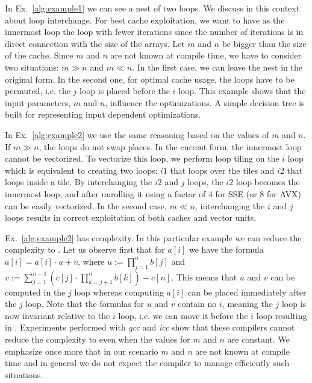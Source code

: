 \setcounter{algorithm}{1}

In Ex.~\ref{alg:example1} we can see a nest of two loops. We discuss in this
context about loop interchange. For best cache exploitation, we want to have as
the innermost loop the loop with fewer iterations since the number of iterations
is in direct connection with the size of the arrays. Let $m$ and $n$ be bigger
than the size of the cache. Since $m$ and $n$ are not known at compile time, we
have to consider two situations: $m \gg n$ and $m \ll n$. In the first case, we
can leave the nest in the original form. In the second one, for optimal cache
usage, the loops have to be permuted, i.e. the $j$ loop is placed before the $i$
loop. This example shows that the input parameters, $m$ and $n$, influence the
optimizations. A simple decision tree is built for representing input dependent
optimizations.

In Ex.~\ref{alg:example2} we use the same reasoning based on the values of $m$
and $n$. If $m \gg n$, the loops do not swap places. In the current form, the
innermost loop cannot be vectorized. To vectorize this loop, we perform loop
tiling on the $i$ loop which is equivalent to creating two loops: $\textit{i1}$
that loops over the tiles and $\textit{i2}$ that loops inside a tile. By
interchanging the $\textit{i2}$ and $j$ loops, the $\textit{i2}$ loop becomes
the innermost loop, and after unrolling it using a factor of 4 for SSE (or 8 for
AVX) can be easily vectorized. In the second case,  $m \ll n$, interchanging the
$i$ and $j$ loops results in correct exploitation of both caches and vector
units.

Ex.~\ref{alg:example2} has  complexity. In this particular
example we can reduce the complexity to . Let us observe first that
for $a[i]$ we have the formula $a[i] = a[i] \cdot u + v$, where $u :=
\prod_{j=1}^n b[j]$ and $v := \sum_{j=1}^{n-1} ( c[j] \cdot \prod_{k=j+1}^n
b[k]) + c[n]$. This means that $u$ and $v$ can be computed in the $j$ loop
whereas computing $a[i]$ can be placed immediately after the $j$ loop. Note that
the formulas for $u$ and $v$ contain no $i$, meaning the $j$ loop is now
invariant relative to the $i$ loop, i.e. we can move it before the $i$ loop
resulting in . Experiments performed with \textit{gcc} and
\textit{icc} show that these compilers cannot reduce the complexity to  even when the values for $m$ and $n$ are constant. We emphasize once more
that in our scenario $m$ and $n$ are not known at compile time and in general we
do not expect the compiler to manage efficiently such situations.

